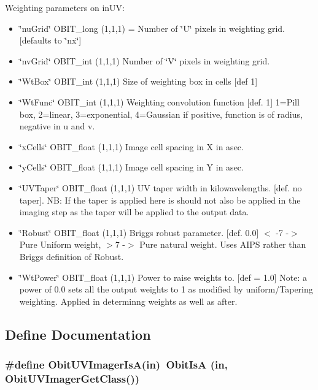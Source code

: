 Weighting parameters on in\-UV: \begin{itemize}
\item \char`\"{}nu\-Grid\char`\"{} OBIT\_\-long (1,1,1) = Number of \char`\"{}U\char`\"{} pixels in weighting grid. [defaults to \char`\"{}nx\char`\"{}] \item \char`\"{}nv\-Grid\char`\"{} OBIT\_\-int (1,1,1) Number of \char`\"{}V\char`\"{} pixels in weighting grid. \item \char`\"{}Wt\-Box\char`\"{} OBIT\_\-int (1,1,1) Size of weighting box in cells [def 1] \item \char`\"{}Wt\-Func\char`\"{} OBIT\_\-int (1,1,1) Weighting convolution function [def. 1] 1=Pill box, 2=linear, 3=exponential, 4=Gaussian if positive, function is of radius, negative in u and v. \item \char`\"{}x\-Cells\char`\"{} OBIT\_\-float (1,1,1) Image cell spacing in X in asec. \item \char`\"{}y\-Cells\char`\"{} OBIT\_\-float (1,1,1) Image cell spacing in Y in asec. \item \char`\"{}UVTaper\char`\"{} OBIT\_\-float (1,1,1) UV taper width in kilowavelengths. [def. no taper]. NB: If the taper is applied here is should not also be applied in the imaging step as the taper will be applied to the output data. \item \char`\"{}Robust\char`\"{} OBIT\_\-float (1,1,1) Briggs robust parameter. [def. 0.0] $<$ -7 -$>$ Pure Uniform weight, $>$7 -$>$ Pure natural weight. Uses AIPS rather than Briggs definition of Robust. \item \char`\"{}Wt\-Power\char`\"{} OBIT\_\-float (1,1,1) Power to raise weights to. [def = 1.0] Note: a power of 0.0 sets all the output weights to 1 as modified by uniform/Tapering weighting. Applied in determinng weights as well as after.\end{itemize}


\subsection{Define Documentation}
\subsubsection{\setlength{\rightskip}{0pt plus 5cm}\#define Obit\-UVImager\-Is\-A(in)\ Obit\-Is\-A (in, Obit\-UVImager\-Get\-Class())}\label{ObitUVImager_8h_a2}


